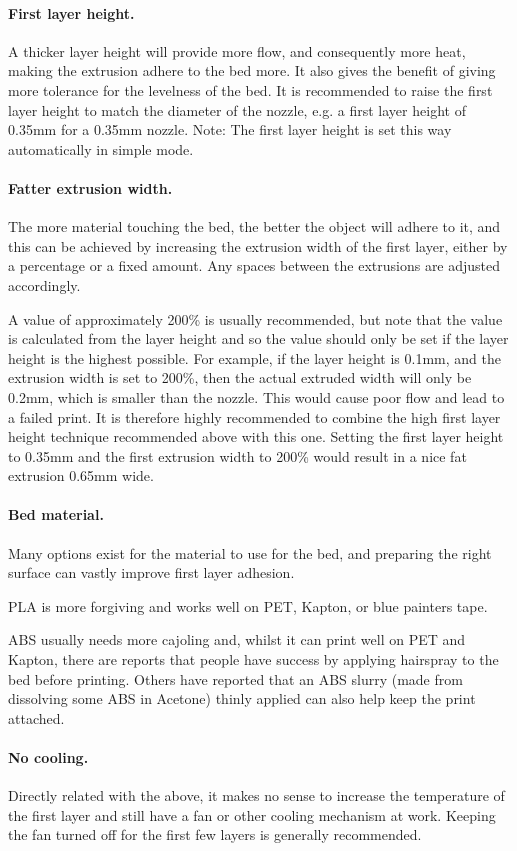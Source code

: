 \paragraph{First layer height.} %
\label{par:first_layer_height}
A thicker layer height will provide more flow, and consequently more heat, making the extrusion adhere to the bed more.  It also gives the benefit of giving more tolerance for the levelness of the bed.  It is recommended to raise the first layer height to match the diameter of the nozzle, e.g. a first layer height of 0.35mm for a 0.35mm nozzle.
Note: The first layer height is set this way automatically in simple mode.

\paragraph{Fatter extrusion width.} %
\label{par:wider_extrusion_width}
The more material touching the bed, the better the object will adhere to it, and this can be achieved by increasing the extrusion width of the first layer, either by a percentage or a fixed amount.  Any spaces between the extrusions are adjusted accordingly.

A value of approximately 200\% is usually recommended, but note that the value is calculated from the layer height and so the value should only be set if the layer height is the highest possible.  For example, if the layer height is 0.1mm, and the extrusion width is set to 200\%, then the actual extruded width will only be 0.2mm, which is smaller than the nozzle.   This would cause poor flow and lead to a failed print.  It is therefore highly recommended to combine the high first layer height technique recommended above with this one. Setting the first layer height to 0.35mm and the first extrusion width to 200\% would result in a nice fat extrusion 0.65mm wide.

\paragraph{Bed material.} %
\label{par:bed_material}
Many options exist for the material to use for the bed, and preparing the right surface can vastly improve first layer adhesion.

PLA is more forgiving and works well on PET, Kapton, or blue painters tape.

ABS usually needs more cajoling and, whilst it can print well on PET and Kapton, there are reports that people have success by applying hairspray to the bed before printing.  Others have reported that an ABS slurry (made from dissolving some ABS in Acetone) thinly applied can also help keep the print attached.

\paragraph{No cooling.} %
\label{par:no_cooling}
Directly related with the above, it makes no sense to increase the temperature of the first layer and still have a fan or other cooling mechanism at work.  Keeping the fan turned off for the first few layers is generally recommended.
